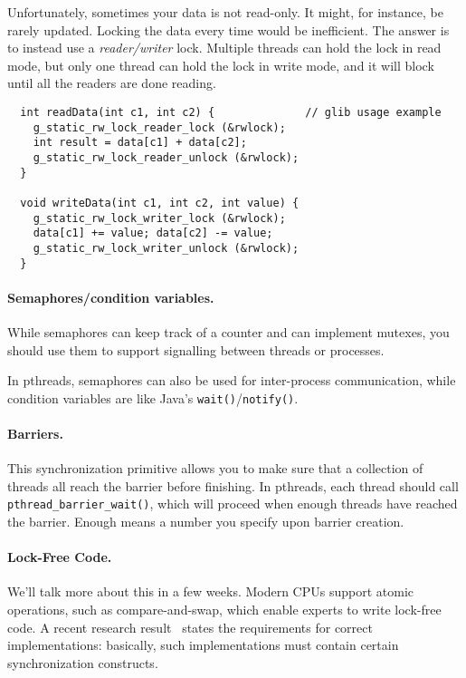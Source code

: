 Unfortunately, sometimes your data is not read-only. It might, for instance,
be rarely updated. Locking the data every time would be inefficient.
The answer is to instead use a \emph{reader/writer} lock. Multiple
threads can hold the lock in read mode, but only one thread can hold the
lock in write mode, and it will block until all the readers are done 
reading.

\begin{verbatim}
  int readData(int c1, int c2) {              // glib usage example
    g_static_rw_lock_reader_lock (&rwlock);
    int result = data[c1] + data[c2];
    g_static_rw_lock_reader_unlock (&rwlock);
  }

  void writeData(int c1, int c2, int value) {
    g_static_rw_lock_writer_lock (&rwlock);
    data[c1] += value; data[c2] -= value;
    g_static_rw_lock_writer_unlock (&rwlock);
  }
\end{verbatim}

\paragraph{Semaphores/condition variables.} 
While semaphores can keep track of a counter and can implement
mutexes, you should use them to support signalling between threads or
processes.

In pthreads, semaphores can also be used for inter-process communication,
while condition variables are like Java's {\tt wait()}/{\tt notify()}.

\paragraph{Barriers.} This synchronization primitive allows you 
to make sure that a collection of threads all reach the
barrier before finishing. In pthreads, each thread should call
\verb+pthread_barrier_wait()+, which will proceed when enough threads
have reached the barrier. Enough means a number you specify upon
barrier creation.

\paragraph{Lock-Free Code.} We'll talk more about this in a few weeks.
Modern CPUs support atomic operations, such as compare-and-swap, which
enable experts to write lock-free code. A recent research 
result~\cite{mckenney11:_concur,Attiya:2011:LOE:1926385.1926442} states the requirements for correct implementations: basically,
such implementations must contain certain synchronization constructs.

